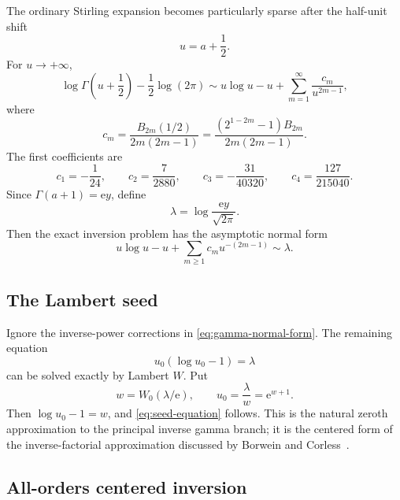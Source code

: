 \documentclass[11pt,a4paper]{article}
\numberwithin{equation}{section}
\theoremstyle{definition}
\theoremstyle{remark}
\newcommand{\e}{\mathrm e}
\begin{document}
The ordinary Stirling expansion becomes particularly sparse after the
half-unit shift
\begin{equation}\label{eq:u-def}
 u=a+\frac12.
\end{equation}
For $u\to+\infty$,
\begin{equation}\label{eq:centered-stirling}
 \log\Gamma\left(u+\frac12\right)-\frac12\log(2\pi)
 \sim u\log u-u+\sum_{m=1}^{\infty}\frac{c_m}{u^{2m-1}},
\end{equation}
where
\begin{equation}\label{eq:c-m}
 c_m=\frac{B_{2m}(1/2)}{2m(2m-1)}
 =\frac{(2^{1-2m}-1)B_{2m}}{2m(2m-1)}.
\end{equation}
The first coefficients are
\begin{equation}\label{eq:c-first}
 c_1=-\frac1{24},\qquad
 c_2=\frac7{2880},\qquad
 c_3=-\frac{31}{40320},\qquad
 c_4=\frac{127}{215040}.
\end{equation}
Since $\Gamma(a+1)=\e y$, define
\begin{equation}\label{eq:lambda-def}
 \lambda=\log\frac{\e y}{\sqrt{2\pi}}.
\end{equation}
Then the exact inversion problem has the asymptotic normal form
\begin{equation}\label{eq:gamma-normal-form}
 u\log u-u+\sum_{m\ge1}c_m u^{-(2m-1)}\sim\lambda.
\end{equation}

\subsection{The Lambert seed}

Ignore the inverse-power corrections in \eqref{eq:gamma-normal-form}.  The
remaining equation
\begin{equation}\label{eq:seed-equation}
 u_0(\log u_0-1)=\lambda
\end{equation}
can be solved exactly by Lambert $W$.  Put
\begin{equation}\label{eq:w-u0-def}
 w=W_0(\lambda/\e),
 \qquad
 u_0=\frac{\lambda}{w}=\e^{w+1}.
\end{equation}
Then $\log u_0-1=w$, and \eqref{eq:seed-equation} follows.  This is the
natural zeroth approximation to the principal inverse gamma branch; it is
the centered form of the inverse-factorial approximation discussed by
Borwein and Corless~\cite{BorweinCorless2018}.

\subsection{All-orders centered inversion}
\end{document}
